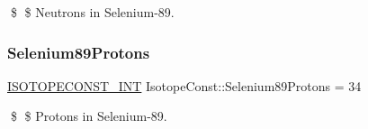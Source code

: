 \$ \$ Neutrons in Selenium-\/89. \mbox{\label{group___isotope_const-_selenium-_se89_ga499c0f487219260ec19f0876f8e56f7b}} 
\subsubsection{\texorpdfstring{Selenium89\+Protons}{Selenium89Protons}}
{\footnotesize\ttfamily \mbox{\hyperlink{group___isotope_const-_macros_ga5f18360b3e99483a35c32d789e62621c}{I\+S\+O\+T\+O\+P\+E\+C\+O\+N\+S\+T\+\_\+\+I\+NT}} Isotope\+Const\+::\+Selenium89\+Protons = 34}

\$ \$ Protons in Selenium-\/89. 